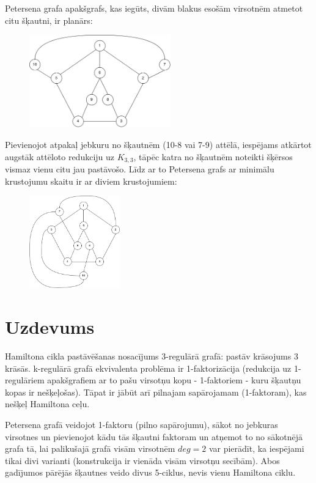 \documentclass[12pt, a4paper]{article}
\begin{document}
Petersena grafa apakšgrafs, kas iegūts, divām blakus esošām virsotnēm atmetot citu šķautni, ir planārs:

\begin{figure}[h!]
    \centering
    \includegraphics[height=4cm,page=1]{task2-2.jpeg}
\end{figure}

Pievienojot atpakaļ jebkuru no šķautnēm (10-8 vai 7-9) attēlā, iespējams atkārtot augstāk attēloto redukciju uz $K_{3,3}$, tāpēc katra no šķautnēm noteikti šķērsos vismaz vienu citu jau pastāvošo. Līdz ar to Petersena grafs ar minimālu krustojumu skaitu ir ar diviem krustojumiem:

\begin{figure}[h!]
    \centering
    \includegraphics[height=4cm,page=1]{task2-3.jpeg}
\end{figure}


\newpage
\section{Uzdevums}

Hamiltona cikla pastāvēšanas nosacījums 3-regulārā grafā: pastāv krāsojums 3 krāsās. k-regulārā grafā ekvivalenta problēma ir 1-faktorizācija (redukcija uz 1-regulāriem apakšgrafiem ar to pašu virsotņu kopu - 1-faktoriem - kuru šķautņu kopas ir nešķeļošas). Tāpat ir jābūt arī pilnajam sapārojamam (1-faktoram), kas nešķeļ Hamiltona ceļu.

Petersena grafā veidojot 1-faktoru (pilno sapārojumu), sākot no jebkuras virsotnes un pievienojot kādu tās šķautni faktoram un atņemot to no sākotnējā grafa tā, lai palikušajā grafā visām virsotnēm $deg=2$ var pierādīt, ka iespējami tikai divi varianti (konstrukcija ir vienāda visām virsotņu secībām). Abos gadījumos pārējās šķautnes veido divus 5-ciklus, nevis vienu Hamiltona ciklu. 
\end{document}
